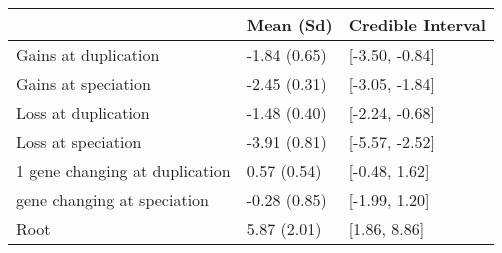 
\begin{tabular}{lll}
\toprule
  & Mean (Sd) & Credible Interval\\
\midrule
Gains at duplication & -1.84 (0.65) & {}[-3.50, -0.84]\\
Gains at speciation & -2.45 (0.31) & {}[-3.05, -1.84]\\
Loss at duplication & -1.48 (0.40) & {}[-2.24, -0.68]\\
Loss at speciation & -3.91 (0.81) & {}[-5.57, -2.52]\\
1 gene changing at duplication & 0.57 (0.54) & {}[-0.48, 1.62]\\
\addlinespace
1 gene changing at speciation & -0.28 (0.85) & {}[-1.99, 1.20]\\
Root & 5.87 (2.01) & {}[1.86, 8.86]\\
\bottomrule
\end{tabular}
